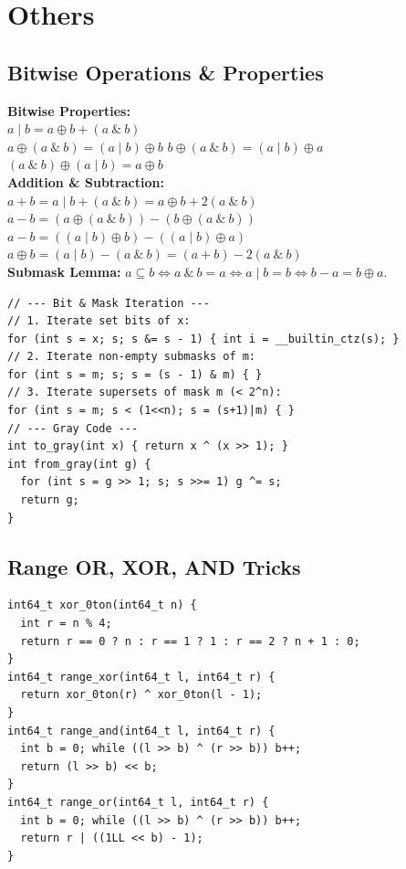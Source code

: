 \section{Others}
\subsection{Bitwise Operations \& Properties}
\textbf{Bitwise Properties:} \\
\textbullet{} $a \mid b = a \oplus b + (a \ \& \ b)$ \\
\textbullet{} $a \oplus (a \ \& \ b) = (a \mid b) \oplus b$ \qquad \textbullet{} $b \oplus (a \ \& \ b) = (a \mid b) \oplus a$ \\
\textbullet{} $(a \ \& \ b) \oplus (a \mid b) = a \oplus b$ \\
\textbf{Addition \& Subtraction:} \\
\textbullet{} $a + b = a \mid b + (a \ \& \ b) = a \oplus b + 2(a \ \& \ b)$ \\
\textbullet{} $a - b = (a \oplus (a \ \& \ b)) - (b \oplus (a \ \& \ b))$ \\
\textbullet{} $a - b = ((a \mid b) \oplus b) - ((a \mid b) \oplus a)$ \\
\textbullet{} $a \oplus b = (a \mid b) - (a \ \& \ b) = (a + b) - 2(a \ \& \ b)$ \\
\textbf{Submask Lemma:} $a \subseteq b \iff a \ \& \ b = a \iff a \mid b = b \iff b - a = b \oplus a$.
\begin{verbatim}
// --- Bit & Mask Iteration ---
// 1. Iterate set bits of x:
for (int s = x; s; s &= s - 1) { int i = __builtin_ctz(s); }
// 2. Iterate non-empty submasks of m:
for (int s = m; s; s = (s - 1) & m) { }
// 3. Iterate supersets of mask m (< 2^n):
for (int s = m; s < (1<<n); s = (s+1)|m) { }
// --- Gray Code ---
int to_gray(int x) { return x ^ (x >> 1); }
int from_gray(int g) {
  for (int s = g >> 1; s; s >>= 1) g ^= s;
  return g;
}
\end{verbatim}

\subsection{Range OR, XOR, AND Tricks}
\begin{verbatim}
int64_t xor_0ton(int64_t n) {
  int r = n % 4;
  return r == 0 ? n : r == 1 ? 1 : r == 2 ? n + 1 : 0;
}
int64_t range_xor(int64_t l, int64_t r) {
  return xor_0ton(r) ^ xor_0ton(l - 1);
}
int64_t range_and(int64_t l, int64_t r) {
  int b = 0; while ((l >> b) ^ (r >> b)) b++;
  return (l >> b) << b;
}
int64_t range_or(int64_t l, int64_t r) {
  int b = 0; while ((l >> b) ^ (r >> b)) b++;
  return r | ((1LL << b) - 1);
}
\end{verbatim}

